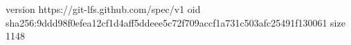 version https://git-lfs.github.com/spec/v1
oid sha256:9ddd98f0efea12cf1d4aff5ddeee5c72f709accf1a731c503afc25491f130061
size 1148
